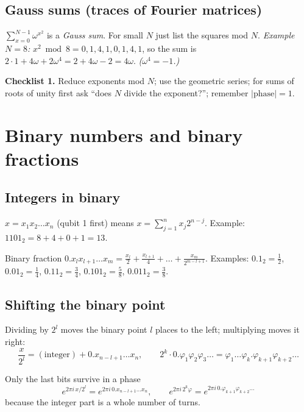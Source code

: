 \documentclass[11pt,a4paper,openany]{book}
\begin{document}
\subsection{Gauss sums (traces of Fourier matrices)}
$\sum_{x=0}^{N-1}\omega^{x^2}$ is a \emph{Gauss sum}. For small $N$ just list the squares mod $N$.
\emph{Example $N = 8$:} $x^2 \bmod 8 = 0,1,4,1,0,1,4,1$, so the sum is $2\cdot1 + 4\omega + 2\omega^4 = 2 + 4\omega - 2 = 4\omega$. \emph{($\omega^4 = -1$.)}

\textbf{Checklist 1.} Reduce exponents mod $N$; use the geometric series; for sums of roots of unity first ask ``does
$N$ divide the exponent?''; remember $|\text{phase}| = 1$.

\section{Binary numbers and binary fractions}
\subsection{Integers in binary}
$x = x_1x_2\dots x_n$ (qubit 1 first) means $x = \sum_{j=1}^{n} x_j 2^{n-j}$. Example: $1101_2 = 8 + 4 + 0 + 1 = 13$.

\begin{defn}{Binary fraction}
$0.x_lx_{l+1}\dots x_m = \frac{x_l}{2} + \frac{x_{l+1}}{4} + \dots + \frac{x_m}{2^{m-l+1}}$. Examples: $0.1_2 = \frac12$, $0.01_2 = \frac14$,
$0.11_2 = \frac34$, $0.101_2 = \frac58$, $0.011_2 = \frac38$.
\end{defn}

\subsection{Shifting the binary point}
Dividing by $2^l$ moves the binary point $l$ places to the left; multiplying moves it right:
\[ \frac{x}{2^l} = (\text{integer}) + 0.x_{n-l+1}\dots x_n, \qquad 2^k\cdot 0.\varphi_1\varphi_2\varphi_3\dots = \varphi_1\dots\varphi_k.\varphi_{k+1}\varphi_{k+2}\dots \]

\begin{keyres}{Only the last bits survive in a phase}
\[ e^{2\pi i\,x/2^l} = e^{2\pi i\,0.x_{n-l+1}\dots x_n}, \qquad e^{2\pi i\,2^k\varphi} = e^{2\pi i\,0.\varphi_{k+1}\varphi_{k+2}\dots} \]
because the integer part is a whole number of turns.
\end{keyres}
\end{document}
